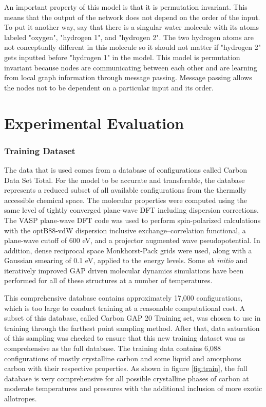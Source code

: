 \documentclass[12pt, abstract = true]{scrartcl}
\begin{document}
An important property of this model is that it is permutation invariant. This means that the output of 
the network does not depend on the order of the input. To put it another way, say that there is a singular
water molecule with its atoms labeled "oxygen", "hydrogen 1", and "hydrogen 2". The two hydrogen atoms 
are not conceptually different in this molecule so it should not matter if "hydrogen 2" gets inputted 
before "hydrogen 1" in the model. This model is permutation invariant because nodes are communicating 
between each other and are learning from local graph information through message passing. Message passing 
allows the nodes not to be dependent on a particular input and its order.




\newpage

\section{Experimental Evaluation}
\subsubsection{Training Dataset}\label{Train}
The data that is used comes from a database of configurations called Carbon Data Set Total\cite{gap20}. For the model to be accurate and transferable, the database represents a reduced subset of all available configurations from the thermally accessible chemical space. The molecular properties were computed using the same level of tightly converged plane-wave DFT including dispersion corrections. The VASP plane-wave DFT code was used to perform spin-polarized calculations with the optB88-vdW dispersion inclusive exchange–correlation functional, a plane-wave cutoff of 600 eV, and a projector augmented wave pseudopotential. In addition, dense reciprocal space Monkhorst-Pack grids were used, along with a Gaussian smearing of 0.1 eV, applied to the energy levels. Some \emph{ab initio} and iteratively improved GAP driven molecular dynamics simulations have been performed for all of these structures at a number of temperatures. 

This comprehensive database contains approximately 17,000 configurations, which is too large to conduct training at a reasonable computational cost. A subset of this database, called Carbon GAP 20 Training set, was chosen to use in training through the farthest point sampling method. After that, data saturation of this sampling was checked to ensure that this new training dataset was as comprehensive as the full database. The training data contains 6,088 configurations of mostly crystalline carbon and some liquid and amorphous carbon with their respective properties. As shown in figure \ref{fig:train}, the full database is very comprehensive for all possible crystalline phases of carbon at moderate temperatures and pressures with the additional inclusion of more exotic allotropes. 
\end{document}
